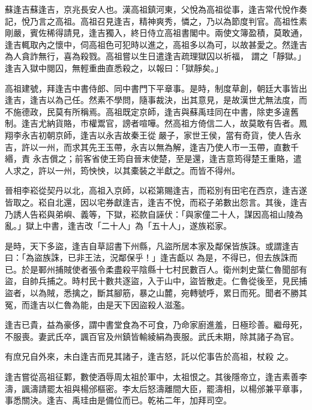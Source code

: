 
\begin{pinyinscope}

 蘇逢吉蘇逢吉，京兆長安人也。漢高祖鎮河東，父悅為高祖從事，逢吉常代悅作奏記，悅乃言之高祖。高祖召見逢吉，精神爽秀，憐之，乃以為節度判官。高祖性素剛嚴，賓佐稀得請見，逢吉獨入，終日侍立高祖書閣中。兩使文簿盈積，莫敢通，逢吉輒取內之懷中，伺高祖色可犯時以進之，高祖多以為可，以故甚愛之。然逢吉為人貪詐無行，喜為殺戮。高祖嘗以生日遣逢吉疏理獄囚以祈福，
 謂之「靜獄。」逢吉入獄中閱囚，無輕重曲直悉殺之，以報曰：「獄靜矣。」



 高祖建號，拜逢吉中書侍郎、同中書門下平章事。是時，制度草創，朝廷大事皆出逢吉，逢吉以為己任。然素不學問，隨事裁決，出其意見，是故漢世尤無法度，而不施德政，民莫有所稱焉。高祖既定京師，逢吉與蘇禹珪同在中書，除吏多違舊制。逢吉尤納貨賂，市權鬻官，謗者喧嘩。然高祖方倚信二人，故莫敢有告者。鳳翔李永吉初朝京師，逢吉以永吉故秦王從嚴子，家世王侯，當有奇貨，使人告永吉，許以一州，而求其先王玉帶，永吉以無為解，逢吉乃使人市一玉帶，直數千緡，責
 永吉償之；前客省使王筠自晉末使楚，至是還，逢吉意筠得楚王重賂，遣人求之，許以一州，筠怏怏，以其橐裝之半獻之。而皆不得州。



 晉相李崧從契丹以北，高祖入京師，以崧第賜逢吉，而崧別有田宅在西京，逢吉遂皆取之。崧自北還，因以宅券獻逢吉，逢吉不悅，而崧子弟數出怨言。其後，逢吉乃誘人告崧與弟嶼、義等，下獄，崧款自誣伏：「與家僮二十人，謀因高祖山陵為亂。」獄上中書，逢吉改「二十人」為「五十人」，遂族崧家。



 是時，天下多盜，逢吉自草詔書下州縣，凡盜所居本家及鄰保皆族誅。或謂逢吉曰：「為盜族誅，已非王法，況鄰保乎！」逢吉甗以
 為是，不得已，但去族誅而已。於是鄆州捕賊使者張令柔盡殺平陰縣十七村民數百人。衛州刺史葉仁魯聞部有盜，自帥兵捕之。時村民十數共逐盜，入于山中，盜皆散走。仁魯從後至，見民捕盜者，以為賊，悉擒之，斷其腳筋，暴之山麓，宛轉號呼，累日而死。聞者不勝其冤，而逢吉以仁魯為能，由是天下因盜殺人滋濫。



 逢吉已貴，益為豪侈，謂中書堂食為不可食，乃命家廚進羞，日極珍善。繼母死，不服喪。妻武氏卒，諷百官及州鎮皆輸綾絹為喪服。武氏未期，除其諸子為官。



 有庶兄自外來，未白逢吉而見其諸子，逢吉怒，託以佗事告於高祖，杖殺
 之。



 逢吉嘗從高祖征鄴，數使酒辱周太祖於軍中，太祖恨之。其後隱帝立，逢吉素善李濤，諷濤請罷太祖與楊邠樞密。李太后怒濤離間大臣，罷濤相，以楊邠兼平章事，事悉關決。逢吉、禹珪由是備位而已。乾祐二年，加拜司空。




\end{pinyinscope}
